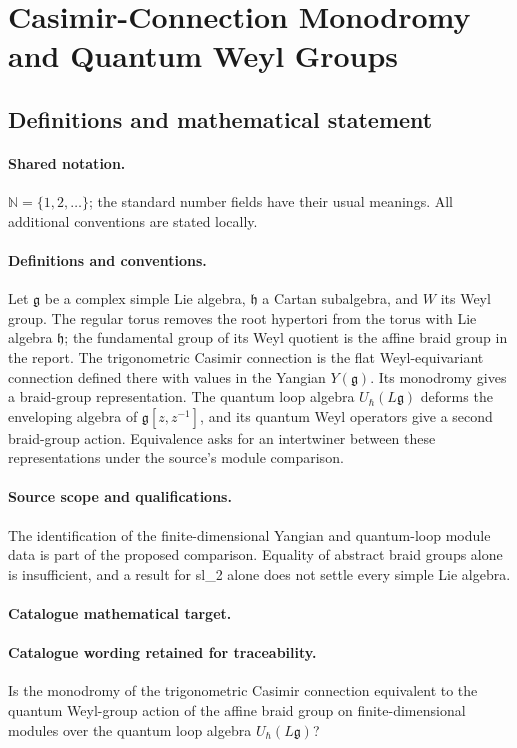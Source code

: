\documentclass[11pt]{article}
\begin{document}
\section{Casimir-Connection Monodromy and Quantum Weyl Groups}\label{statement}

\subsection{Definitions and mathematical statement}

\paragraph{Shared notation.}$\mathbb N=\{1,2,\ldots\}$; the standard number fields have their usual meanings. All additional conventions are stated locally.


\paragraph{Definitions and conventions.} Let $\mathfrak g$ be a complex simple Lie algebra, $\mathfrak h$ a Cartan subalgebra, and $W$ its Weyl group. The regular torus removes the root hypertori from the torus with Lie algebra $\mathfrak h$; the fundamental group of its Weyl quotient is the affine braid group in the report. The trigonometric Casimir connection is the flat Weyl-equivariant connection defined there with values in the Yangian $Y(\mathfrak g)$. Its monodromy gives a braid-group representation. The quantum loop algebra $U_\hbar(L\mathfrak g)$ deforms the enveloping algebra of $\mathfrak g[z,z^{-1}]$, and its quantum Weyl operators give a second braid-group action. Equivalence asks for an intertwiner between these representations under the source's module comparison.

\paragraph{Source scope and qualifications.} The identification of the finite-dimensional Yangian and quantum-loop module data is part of the proposed comparison. Equality of abstract braid groups alone is insufficient, and a result for sl\_2 alone does not settle every simple Lie algebra.

\paragraph{Catalogue mathematical target.}
\paragraph{Catalogue wording retained for traceability.}
Is the monodromy of the trigonometric Casimir connection equivalent to the quantum Weyl-group action of the affine braid group on finite-dimensional modules over the quantum loop algebra $U_{\hbar}(L\mathfrak g)$?
\end{document}
